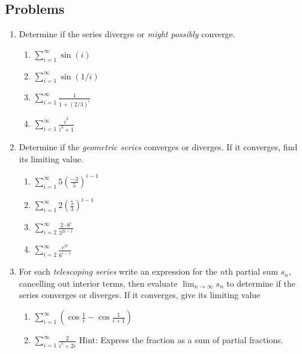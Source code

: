 \documentclass[12pt,letterpaper,fleqn]{article}
\newcommand{\ds}{\displaystyle}
\theoremstyle{definition}
\theoremstyle{defintion}
\begin{document}
  \subsection*{Problems}
  \begin{enumerate}
    \item Determine if the series diverges or \emph{might possibly} converge.
    \begin{enumerate}
      \item $\ds\sum_{i=1}^\infty\sin(i)$
      \item $\ds\sum_{i=1}^\infty\sin(1/i)$
      \item $\ds\sum_{i=1}^\infty \frac{1}{1 + (2/3)^i}$
      \item $\ds\sum_{i=1}^\infty \frac{i^2}{i^3+1}$
    \end{enumerate}
    \newpage
    \item Determine if the \emph{geometric series} converges or diverges. If it converges, find its limiting value.
    \begin{enumerate}
      \item $\ds\sum_{i=1}^\infty 5\left(\frac{-3}{5}\right)^{i-1}$
      \item $\ds\sum_{i=1}^\infty 2\left(\frac{5}{3}\right)^{i-1}$
      \item $\ds\sum_{i=2}^\infty\frac{2\cdot 8^i}{3^{2i-1}}$
      \item $\ds\sum_{i=2}^\infty\frac{e^{2i}}{6^{i-1}}$
    \end{enumerate}
    \item For each \emph{telescoping series} write an expression for the $n$th partial sum $s_n$, cancelling out interior terms, then evaluate $\lim_{n\to\infty} s_n$ to determine if the series converges or diverges. If it converges, give its limiting value
    \begin{enumerate}
      \item $\ds\sum_{i=1}^\infty\left(\cos\frac{1}{i} - \cos\frac{1}{i+1}\right)$
      \item $\ds\sum_{i=1}^\infty\frac{2}{i^2+2i}$ Hint: Express the fraction as a sum of partial fractions.
    \end{enumerate}
  \end{enumerate}
\end{document}
